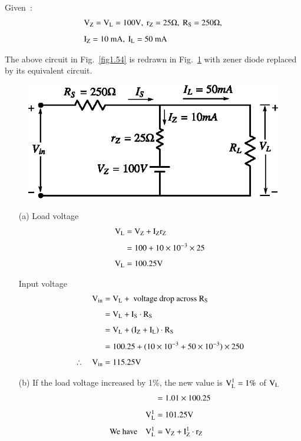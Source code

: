 \begin{solution}
Given~:
\begin{align*}
& \textrm{V}_{\textrm{Z}} =\textrm{V}_{\textrm{L}}=100\textrm{V}, \ \textrm{r}_{\textrm{Z}}=25\Omega, \ \textrm{R}_{\textrm{S}}=250\Omega,\\[5pt]
& \textrm{I}_{\textrm{Z}}=10\text{~mA}, \ \textrm{I}_{\textrm{L}}=50\text{~mA}
\end{align*}

The above circuit in Fig.~\ref{fig1.54} is redrawn in Fig.~\ref{fig1.55} with zener diode replaced by its equivalent circuit.
\begin{figure}[H]
\centering
\includegraphics{chap1/fig1.55.eps}
\caption{}\label{fig1.55}
\end{figure}
\begin{itemize}
\item[(a)] Load voltage
\begin{align*}
\textrm{V}_{\textrm{L}} &= \textrm{V}_{\textrm{Z}}+\textrm{I}_{\textrm{Z}}\textrm{r}_{\textrm{Z}}\\[4pt]
          &= 100+10\times 10^{-3}\times 25\\[4pt]
\textrm{V}_{\textrm{L}} &= 100.25\textrm{V}
\end{align*}

\eject

Input voltage
\begin{align*}
\textrm{V}_{\text{in}} &= \textrm{V}_{\textrm{L}}+\text{~voltage drop across } \textrm{R}_{\textrm{S}}\\[4pt]
&= \textrm{V}_{\textrm{L}}+\textrm{I}_{\textrm{S}}\cdot \textrm{R}_{\textrm{S}}\\[4pt]
&= \textrm{V}_{\textrm{L}}+(\textrm{I}_{\textrm{Z}}+\textrm{I}_{\textrm{L}})\cdot \textrm{R}_{\textrm{S}}\\[4pt]
&= 100.25+(10\times 10^{-3}+50\times 10^{-3})\times 250\\[4pt]
\therefore\quad \textrm{V}_{\text{in}} &= 115.25\textrm{V}
\end{align*}

\item[(b)] If the load voltage increased by 1\%, the new value is $\textrm{V}^{1}_{\textrm{L}}=1\%$ of $\textrm{V}_{\textrm{L}}$
\begin{align*}
&= 1.01\times 100.25\\[4pt]
\textrm{V}_{\textrm{L}}^{1} &= 101.25\textrm{V}\\[4pt]
\text{We have}\quad \textrm{V}_{\textrm{L}}^{1} &= \textrm{V}_{\textrm{Z}}+\textrm{I}^{1}_{\textrm{Z}}\cdot \textrm{r}_{\textrm{Z}}
\end{align*}


\end{itemize}
\end{solution}
